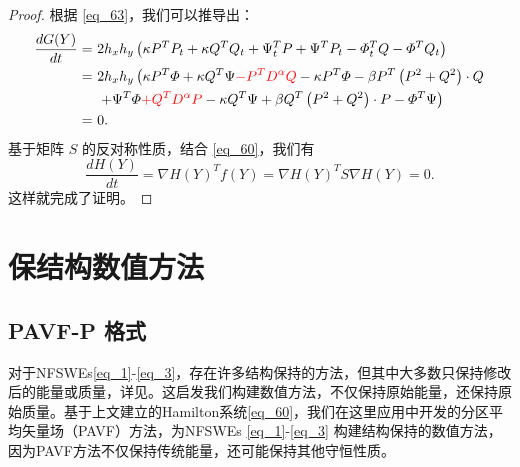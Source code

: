 \begin{proof}
	根据 \eqref{eq_63}，我们可以推导出：
	\begin{align}\label{eq_64}
		\frac{d G(Y)}{d t}=&~2 h_{x} h_{y}\left(\kappa P^{T}P_t+\kappa Q^{T}Q_t+\Psi^{T}_t P+\Psi^{T}P_{t}-\varPhi^{T}_t Q-\varPhi^{T}Q_{t}\right)\nonumber\\
		=&~2 h_{x} h_{y}\left(\kappa P^{T}\varPhi+\kappa Q^{T}\Psi \textcolor[rgb]{1.00,0.00,0.00}{- P^{T}D^{\alpha}Q}-\kappa P^{T}\varPhi-\beta P^{T}\left( P^{2}+Q^{2}\right)\cdot Q\right.\nonumber\\
		&~\left.+\Psi^{T}\varPhi\textcolor[rgb]{1.00,0.00,0.00}{+Q^{T}D^{\alpha}P}-\kappa Q^{T}\Psi+\beta Q^{T}\left( P^{2}+Q^{2}\right)\cdot P-\varPhi^{T}\Psi\right)\nonumber\\
		=&~0.
		\end{align}
		基于矩阵 $S$ 的反对称性质，结合 \eqref{eq_60}，我们有
		\begin{equation}\label{eq_65}
		\frac{d H(Y)}{d t}=\nabla H(Y)^{T} f(Y)=\nabla H(Y)^{T} S \nabla H(Y)=0 .
		\end{equation}
		这样就完成了证明。
		\end{proof}


	\section{保结构数值方法}\label{Section 3}
	\subsection{PAVF-P 格式}

对于NFSWEs\eqref{eq_1}-\eqref{eq_3}，存在许多结构保持的方法，但其中大多数只保持修改后的能量或质量，详见\cite{liFastEnergyConserving2018,huEfficientEnergyPreserving2022}。这启发我们构建数值方法，不仅保持原始能量，还保持原始质量。基于上文建立的Hamilton系统\eqref{eq_60}，我们在这里应用\cite{caiPartitionedAveragedVector2018}中开发的分区平均矢量场（PAVF）方法，为NFSWEs \eqref{eq_1}-\eqref{eq_3} 构建结构保持的数值方法，因为PAVF方法不仅保持传统能量，还可能保持其他守恒性质。

